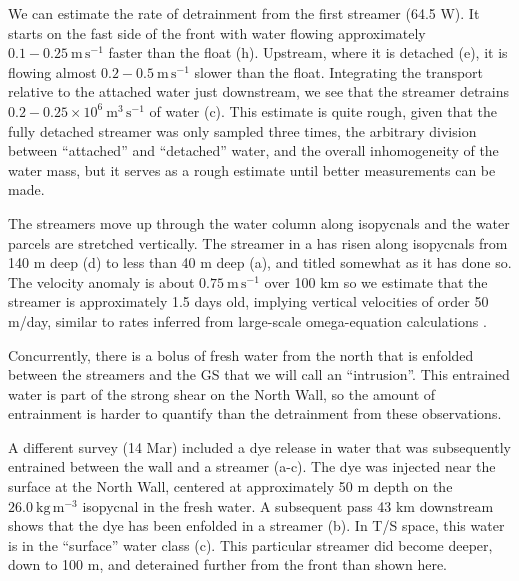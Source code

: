 \documentclass[draft,grl]{agutex2015}
\begin{document}
\begin{article}
We can estimate the rate of detrainment from the first streamer (64.5 W). It starts on the fast side of the front with water flowing approximately $0.1-0.25\ \mathrm{m\,s^{-1}}$ faster than the float (h). Upstream, where it is detached (e), it is flowing almost $0.2-0.5\ \mathrm{m\,s^{-1}}$ slower than the float.  Integrating the transport relative to the attached water just downstream, we see that the streamer detrains $0.2-0.25 \times 10^6\ \mathrm{m^3\,s^{-1}}$ of water (c).  This estimate is quite rough, given that the fully detached streamer was only sampled three times, the arbitrary division between ``attached'' and ``detached'' water, and the overall inhomogeneity of the water mass, but it serves as a rough estimate until better measurements can be made.  

The streamers move up through the water column along isopycnals and the water parcels are stretched vertically. The streamer in a has risen along isopycnals from 140 m deep (d)  to less than 40 m deep (a), and titled somewhat as it has done so.   The velocity anomaly is about $0.75\ \mathrm{m\,s^{-1}}$ over 100 km so we estimate that the streamer is approximately 1.5 days old,  implying vertical velocities of order  50 m/day, similar to rates inferred from large-scale omega-equation calculations \citep{thomasjoyce10}.  

Concurrently, there is a bolus of fresh water from the north that is enfolded between the streamers and the GS that we will call an ``intrusion''. This entrained water is part of the strong shear on the North Wall, so the amount of entrainment is harder to quantify than the detrainment from these observations.


A different survey (14 Mar) included a dye release in water that was subsequently entrained between the wall and a streamer (a-c).  The dye was injected near the surface at the North Wall, centered at approximately 50 m depth on the $26.0 \ \mathrm{kg\,m^{-3}}$ isopycnal in the fresh water.  A subsequent pass 43 km downstream shows that the dye has been enfolded in a streamer (b).  In T/S space, this water is in the ``surface'' water class (c).  This particular streamer did become deeper, down to 100 m, and deterained further from the front than shown here.  
    

\end{article}
\end{document}
